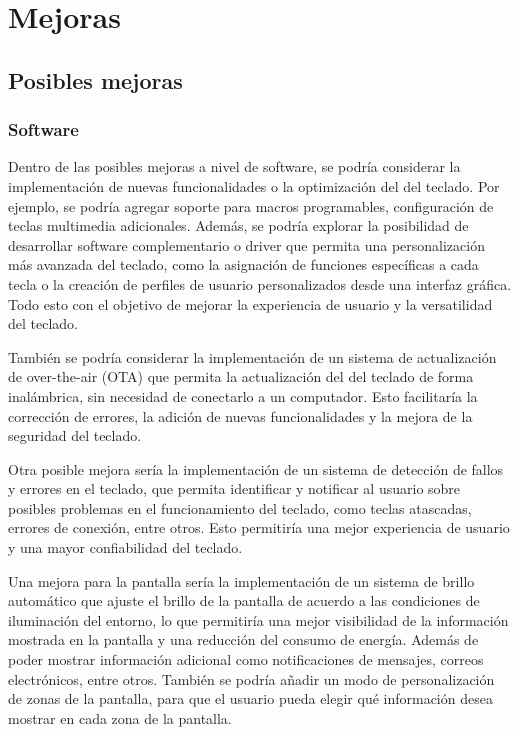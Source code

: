 \chapter{Mejoras}

\section{Posibles mejoras}
\subsection{Software}
Dentro de las posibles mejoras a nivel de software, se podría considerar la implementación de nuevas funcionalidades o la optimización del  del teclado. Por ejemplo, se podría agregar soporte para macros programables, configuración de teclas multimedia adicionales. Además, se podría explorar la posibilidad de desarrollar software complementario o driver que permita una personalización más avanzada del teclado, como la asignación de funciones específicas a cada tecla o la creación de perfiles de usuario personalizados desde una interfaz gráfica. Todo esto con el objetivo de mejorar la experiencia de usuario y la versatilidad del teclado.

También se podría considerar la implementación de un sistema de actualización de  over-the-air (OTA) que permita la actualización del  del teclado de forma inalámbrica, sin necesidad de conectarlo a un computador. Esto facilitaría la corrección de errores, la adición de nuevas funcionalidades y la mejora de la seguridad del teclado.

Otra posible mejora sería la implementación de un sistema de detección de fallos y errores en el teclado, que permita identificar y notificar al usuario sobre posibles problemas en el funcionamiento del teclado, como teclas atascadas, errores de conexión, entre otros. Esto permitiría una mejor experiencia de usuario y una mayor confiabilidad del teclado.

Una mejora para la pantalla sería la implementación de un sistema de brillo automático que ajuste el brillo de la pantalla de acuerdo a las condiciones de iluminación del entorno, lo que permitiría una mejor visibilidad de la información mostrada en la pantalla y una reducción del consumo de energía. Además de poder mostrar información adicional como notificaciones de mensajes, correos electrónicos, entre otros. También se podría añadir un modo de personalización de zonas de la pantalla, para que el usuario pueda elegir qué información desea mostrar en cada zona de la pantalla.

